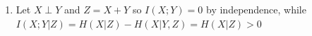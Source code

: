 \documentclass[12pt, a4paper]{article}
\begin{document}
\begin{enumerate}[Q\arabic*.]
  \item Let $X \perp Y$ and $Z=X+Y$ so $I(X;Y)=0$ by independence, while $I(X;Y|Z) = H(X|Z) - H(X|Y,Z) = H(X|Z) > 0$
\end{enumerate}
\end{document}
